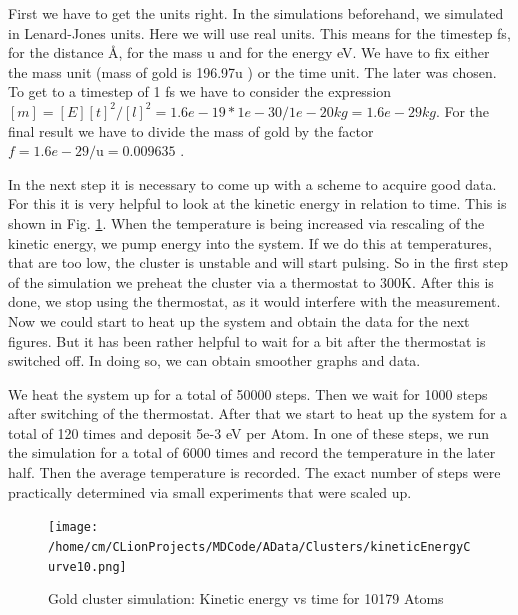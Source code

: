 \par 
First we have to get the units right. In the simulations beforehand, we simulated in Lenard-Jones units. 
Here we will use real units. 
This means for the timestep fs, for the distance \r{A}, for the mass u and for the energy eV. 
We have to fix either the mass unit (mass of gold is 196.97u \cite{Kurzweil2015}) or the time unit. 
The later was chosen. To get to a timestep of 1 fs we have to consider the expression $ [m] = [E][t]^2/[l]^2 = 1.6e-19 * 1e-30/1e-20 kg = 1.6e-29kg $. For the final result we have to divide the mass of gold by the factor $ f = 1.6e-29/\mathrm{u} = 0.009635 $
\cite{molDymCourse}.

In the next step it is necessary to come up with a scheme to acquire good data.
For this it is very helpful to look at the kinetic energy in relation to time. 
This is shown in Fig. \ref{GoldClusterSimulationKinVsTime}. 
When the temperature is being increased via rescaling of the kinetic energy, we pump energy into the system. 
If we do this at temperatures, that are too low, the cluster is unstable and will start pulsing. 
So in the first step of the simulation we preheat the cluster via a thermostat to 300K. 
After this is done, we stop using the thermostat, as it would interfere with the measurement. 
Now we could start to heat up the system and obtain the data for the next figures. But it has been rather helpful to wait for a bit after the thermostat is switched off. In doing so, we can obtain smoother graphs and data. 
\par
We heat the system up for a total of 50000 steps. Then we wait for 1000 steps after switching of the thermostat. 
After that we start to heat up the system for a total of 120 times and deposit 5e-3 eV per Atom. 
In one of these steps, we run the simulation for a total of 6000 times and record the temperature in the later half. 
Then the average temperature is recorded. 
The exact number of steps were practically determined via small experiments that were scaled up. 
\begin{figure}
	\begin{center} 
		\texttt{[image: /home/cm/CLionProjects/MDCode/AData/Clusters/kineticEnergyCurve10.png]} 
	\end{center} 
	\caption[Gold cluster simulation: Kinetic Energy vs Time]{Gold cluster simulation: Kinetic energy vs time for 10179 Atoms} 
	\label{GoldClusterSimulationKinVsTime} 
\end{figure} 


